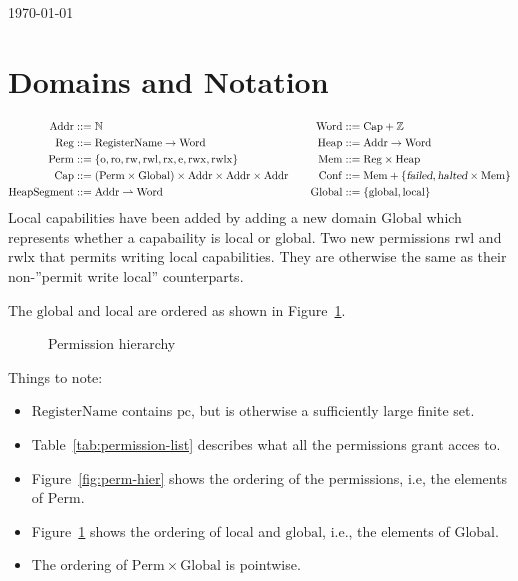 \documentclass{article}
\newcommand{\parfun}{\rightharpoonup}
\newcommand{\pcreg}{\mathrm{pc}}
\newcommand{\failed}{\textsl{failed}}
\newcommand{\halted}{\textsl{halted}}
\newcommand{\plaindom}[1]{\mathrm{#1}}
\newcommand{\Caps}{\plaindom{Cap}}
\newcommand{\Words}{\plaindom{Word}}
\newcommand{\Addrs}{\plaindom{Addr}}
\newcommand{\Mems}{\plaindom{Mem}}
\newcommand{\RegName}{\plaindom{RegisterName}}
\newcommand{\Regs}{\plaindom{Reg}}
\newcommand{\Heaps}{\plaindom{Heap}}
\newcommand{\HeapSegments}{\plaindom{HeapSegment}}
\newcommand{\Confs}{\plaindom{Conf}}
\newcommand{\nats}{\mathbb{N}}
\newcommand{\ints}{\mathbb{Z}}
\newcommand{\Perms}{\plaindom{Perm}}
\newcommand{\Globals}{\plaindom{Global}}
\newcommand{\plainperm}[1]{\mathrm{#1}}
\newcommand{\noperm}{\plainperm{o}}
\newcommand{\readonly}{\plainperm{ro}}
\newcommand{\readwrite}{\plainperm{rw}}
\newcommand{\exec}{\plainperm{rx}}
\newcommand{\entry}{\plainperm{e}}
\newcommand{\rwx}{\plainperm{rwx}}
\newcommand{\readwritel}{\plainperm{rwl}}
\newcommand{\rwlx}{\plainperm{rwlx}}
\newcommand{\local}{\plainperm{local}}
\newcommand{\glob}{\plainperm{global}}
\begin{document}
\begin{flushright}
\today
\end{flushright}
\section{Domains and Notation}
\begin{align*}
\Addrs &::= \nats & & &
\Words &::= \Caps + \ints \\
\Regs  &::= \RegName \rightarrow \Words & & &
\Heaps &::= \Addrs \rightarrow \Words \\
\Perms &::= \{ \noperm, \readonly, \readwrite, \readwritel, \exec, \entry, \rwx, \rwlx\} & & &
\Mems  &::= \Regs \times \Heaps \\
\Caps  &::= (\Perms \times \Globals) \times \Addrs \times \Addrs \times \Addrs & & &
\Confs &::= \Mems + \{\failed, \halted \times \Mems\} \\
\HeapSegments &::= \Addrs \parfun \Words & & &
\Globals & ::= \{\glob, \local \}
\end{align*}
Local capabilities have been added by adding a new domain $\Globals$ which represents whether a capabaility is local or global. Two new permissions $\readwritel$ and $\rwlx$ that permits writing local capabilities. They are otherwise the same as their non-''permit write local'' counterparts.

The $\glob$ and $\local$ are ordered as shown in Figure~\ref{fig:glob-hier}.
\begin{figure}[!h]
  \centering
\caption{Permission hierarchy}
\label{fig:glob-hier}
\end{figure}

Things to note:
\begin{itemize}
\item $\RegName$ contains $\pcreg$, but is otherwise a sufficiently
  large finite set.
\item Table~\ref{tab:permission-list} describes what all the permissions grant acces to.
\item Figure~\ref{fig:perm-hier} shows the ordering of the permissions, i.e, the elements of $\Perms$.
\item Figure~\ref{fig:glob-hier} shows the ordering of $\local$ and $\glob$, i.e., the elements of $\Globals$.
\item The ordering of $\Perms \times \Globals$ is pointwise.
\end{itemize}
\end{document}

